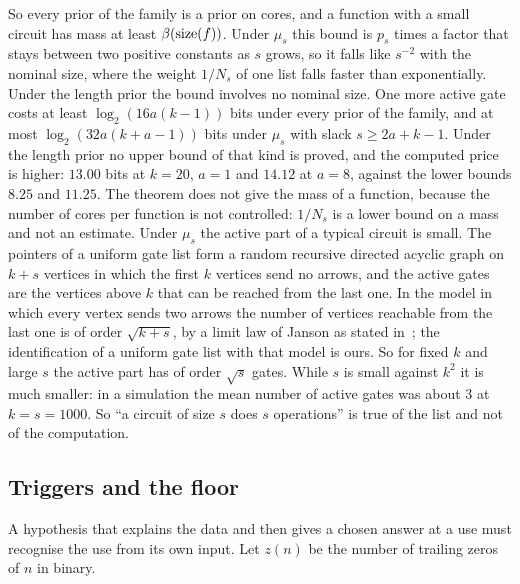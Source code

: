 So every prior of the family is a prior on cores, and a function with a small circuit has mass at least
$\beta(\mathrm{size}(f))$. Under $\mu_s$ this bound is $p_s$ times a factor that stays between two positive constants
as $s$ grows, so it falls like $s^{-2}$ with the nominal size, where the weight $1/N_s$ of one list falls
faster than exponentially. Under the length prior the bound involves no nominal size. One more active gate
costs at least $\log_2(16a(k-1))$ bits under every prior of the family, and at most $\log_2(32a(k+a-1))$ bits
under $\mu_s$ with slack $s\ge2a+k-1$. Under the length prior no upper bound of that kind is proved, and the
computed price is higher: $13.00$ bits at $k=20$, $a=1$ and $14.12$ at $a=8$, against the lower bounds $8.25$
and $11.25$. The theorem does not give the mass of a function, because the number of cores per function is not
controlled: $1/N_s$ is a lower bound on a mass and not an estimate. Under $\mu_s$ the active part of a typical
circuit is small. The pointers of a uniform gate list form a random recursive directed acyclic graph on $k+s$
vertices in which the first $k$ vertices send no arrows, and the active gates are the vertices above $k$ that
can be reached from the last one. In the model in which every vertex sends two arrows the number of vertices
reachable from the last one is of order $\sqrt{k+s}$, by a limit law of Janson as stated in~\cite{burghart26};
the identification of a uniform gate list with that model is ours. So for fixed $k$ and large $s$ the active
part has of order $\sqrt s$ gates. While $s$ is small against $k^2$ it is much smaller: in a simulation the
mean number of active gates was about $3$ at $k=s=1000$. So ``a circuit of size $s$ does $s$ operations'' is
true of the list and not of the computation.

\subsection{Triggers and the floor}

A hypothesis that explains the data and then gives a chosen answer at a use must recognise the use from its
own input. Let $z(n)$ be the number of trailing zeros of $n$ in binary.

